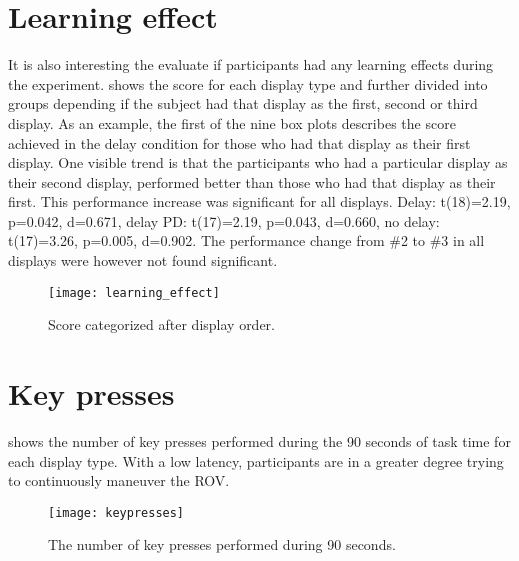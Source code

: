\section{Learning effect}

It is also interesting the evaluate if participants had any learning effects during the experiment.  shows the score for each display type and further divided into groups depending if the subject had that display as the first, second or third display. As an example, the first of the nine box plots describes the score achieved in the delay condition for those who had that display as their first display. One visible trend is that the participants who had a particular display as their second display, performed better than those who had that display as their first. This performance increase was significant for all displays. Delay: t(18)=2.19, p=0.042, d=0.671, delay PD: t(17)=2.19, p=0.043, d=0.660, no delay: t(17)=3.26, p=0.005, d=0.902. The performance change from \#2 to \#3 in all displays were however not found significant.

\begin{figure}[h!]
    \centering
    \texttt{[image: learning\_effect]}
    \caption{Score categorized after display order.}
    \label{learning_effect}
\end{figure}

\section{Key presses}

 shows the number of key presses performed during the 90 seconds of task time for each display type. With a low latency, participants are in a greater degree trying to continuously maneuver the ROV.

\begin{figure}[h!]
    \centering
    \texttt{[image: keypresses]}
    \caption{The number of key presses performed during 90 seconds.}
    \label{keypresses}
\end{figure}
